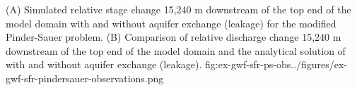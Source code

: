 \begin{StandardFigure}
	{(A) Simulated relative stage change 15,240 m downstream of the top end of the model domain with and without aquifer exchange (leakage) for the modified Pinder-Sauer problem. (B) Comparison of relative discharge change 15,240 m downstream of the top end of the model domain and the analytical solution of \cite{lal2001modification}  with and without aquifer exchange (leakage).}
	{fig:ex-gwf-sfr-ps-obs}{../figures/ex-gwf-sfr-pindersauer-observations.png}
\end{StandardFigure}



